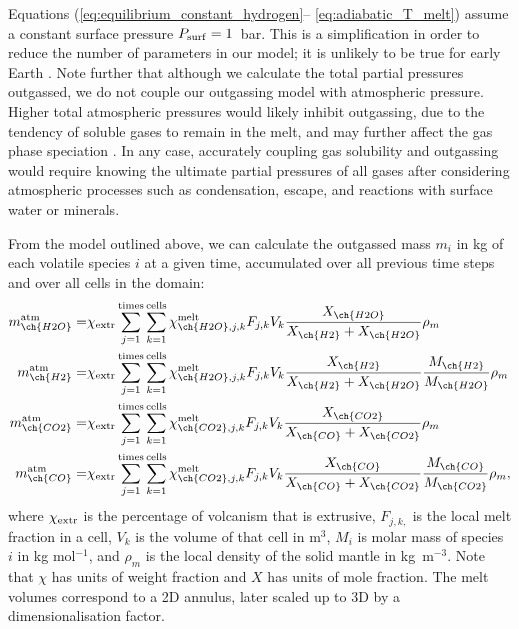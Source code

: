 Equations (\ref{eq:equilibrium_constant_hydrogen}-- \ref{eq:adiabatic_T_melt}) assume a constant surface pressure $P_{\rm surf} = 1$~bar. This is a simplification in order to reduce the number of parameters in our model; it is unlikely to be true for early Earth \citep[e.g.,][]{Catling2020}. Note further that although we calculate the total partial pressures outgassed, we do not couple our outgassing model with atmospheric pressure. Higher total atmospheric pressures would likely inhibit outgassing, due to the tendency of soluble gases to remain in the melt, and may further affect the gas phase speciation \citep[discussed in detail in][e.g.]{gaillard_theoretical_2014}. In any case, accurately coupling gas solubility and outgassing would require knowing the ultimate partial pressures of all gases after considering atmospheric processes such as condensation, escape, and reactions with surface water or minerals.

From the model outlined above, we can calculate the outgassed mass $m_i$ in kg of each volatile species $i$ at a given time, accumulated over all previous time steps and over all cells in the domain:
{%
    \begin{equation}\begin{split}
    m_{\ch{H2O}}^{\rm atm} = &\chi_{\rm extr} \sum\limits_{j=1}^{\rm times} \sum\limits_{k=1}^{\rm cells} \chi_{\ch{H2O}, j, k}^{\rm melt} F_{j,k} V_{k} \frac{X_{\ch{H2O}}}{X_{\ch{H2}}+X_{\ch{H2O}}} \rho_{m}
    \\
    m_{\ch{H2}}^{\rm atm} = &\chi_{\rm extr} \sum\limits_{j=1}^{\rm times} \sum\limits_{k=1}^{\rm cells} \chi_{\ch{H2O}, j, k}^{\rm melt} F_{j,k} V_{k} \frac{X_{\ch{H2}}}{X_{\ch{H2}}+X_{\ch{H2O}}} \frac{M_{\ch{H2}}}{M_{\ch{H2O}}} \rho_{m}
    \\
    m_{\ch{CO2}}^{\rm atm} = &\chi_{\rm extr} \sum\limits_{j=1}^{\rm times} \sum\limits_{k=1}^{\rm cells} \chi_{\ch{CO2}, j, k}^{\rm melt} F_{j,k} V_{k} \frac{X_{\ch{CO2}}}{X_{\ch{CO}}+X_{\ch{CO2}}}\rho_{m}
    \\
    m_{\ch{CO}}^{\rm atm} = &\chi_{\rm extr} \sum\limits_{j=1}^{\rm times} \sum\limits_{k=1}^{\rm cells} \chi_{\ch{CO2}, j, k}^{\rm melt} F_{j,k} V_{k} \frac{X_{\ch{CO}}}{X_{\ch{CO}}+X_{\ch{CO2}}} \frac{M_{\ch{CO}}}{M_{\ch{CO2}}} \rho_{m},
\end{split}\label{eq:m_atm}
\end{equation}}
where $\chi_{\rm extr}$ is the percentage of volcanism that is extrusive, $F_{j,k,}$ is the local melt fraction in a cell, $V_{k}$ is the volume of that cell in m$^{3}$, $M_i$ is molar mass of species $i$ in kg mol$^{-1}$, and $\rho_{m}$ is the local density of the solid mantle in kg~m$^{-3}$. Note that $\chi$ has units of weight fraction and $X$ has units of mole fraction. The melt volumes correspond to a 2D annulus, later scaled up to 3D by a dimensionalisation factor.  

